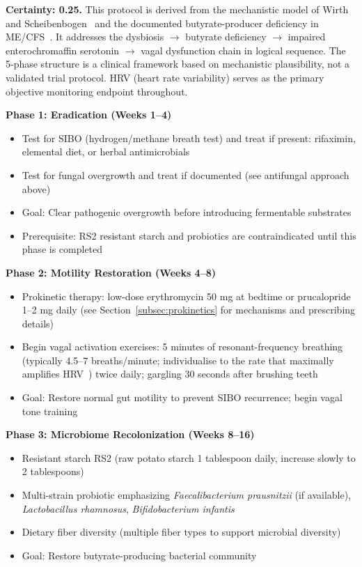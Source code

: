 \begin{speculation}
\label{spec:gut-vagal-protocol}
\textbf{Certainty: 0.25.} This protocol is derived from the mechanistic model of Wirth and Scheibenbogen~\cite{WirthScheibenbogen2025Neurotransmitter} and the documented butyrate-producer deficiency in ME/CFS~\cite{ButyrateDeficiency2023}. It addresses the dysbiosis $\to$ butyrate deficiency $\to$ impaired enterochromaffin serotonin $\to$ vagal dysfunction chain in logical sequence. The 5-phase structure is a clinical framework based on mechanistic plausibility, not a validated trial protocol. HRV (heart rate variability) serves as the primary objective monitoring endpoint throughout.

\textbf{Phase 1: Eradication (Weeks 1--4)}
\begin{itemize}
    \item Test for SIBO (hydrogen/methane breath test) and treat if present: rifaximin, elemental diet, or herbal antimicrobials
    \item Test for fungal overgrowth and treat if documented (see antifungal approach above)
    \item Goal: Clear pathogenic overgrowth before introducing fermentable substrates
    \item Prerequisite: RS2 resistant starch and probiotics are contraindicated until this phase is completed
\end{itemize}

\textbf{Phase 2: Motility Restoration (Weeks 4--8)}
\begin{itemize}
    \item Prokinetic therapy: low-dose erythromycin 50 mg at bedtime or prucalopride 1--2 mg daily (see Section~\ref{subsec:prokinetics} for mechanisms and prescribing details)
    \item Begin vagal activation exercises: 5 minutes of resonant-frequency breathing (typically 4.5--7 breaths/minute; individualise to the rate that maximally amplifies HRV~\cite{Lehrer2014hrv}) twice daily; gargling 30 seconds after brushing teeth
    \item Goal: Restore normal gut motility to prevent SIBO recurrence; begin vagal tone training
\end{itemize}

\textbf{Phase 3: Microbiome Recolonization (Weeks 8--16)}
\begin{itemize}
    \item Resistant starch RS2 (raw potato starch 1 tablespoon daily, increase slowly to 2 tablespoons)
    \item Multi-strain probiotic emphasizing \textit{Faecalibacterium prausnitzii} (if available), \textit{Lactobacillus rhamnosus}, \textit{Bifidobacterium infantis}
    \item Dietary fiber diversity (multiple fiber types to support microbial diversity)
    \item Goal: Restore butyrate-producing bacterial community
\end{itemize}


\end{speculation}
